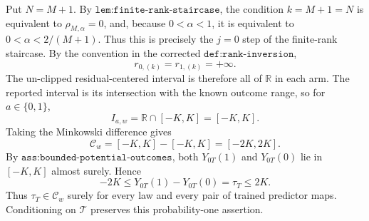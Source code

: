 Put \(N=M+1\). By \(\texttt{lem:finite-rank-staircase}\), the condition \(k=M+1=N\) is equivalent to \(\rho_{M,\alpha}=0\), and, because \(0<\alpha<1\), it is equivalent to \(0<\alpha<2/(M+1)\). Thus this is precisely the \(j=0\) step of the finite-rank staircase. By the convention in the corrected \(\texttt{def:rank-inversion}\),
\[r_{0,(k)}=r_{1,(k)}=+\infty.\]
The un-clipped residual-centered interval is therefore all of \(\mathbb R\) in each arm. The reported interval is its intersection with the known outcome range, so for \(a\in\{0,1\}\),
\[I_{a,w}=\mathbb R\cap[-K,K]=[-K,K].\]
Taking the Minkowski difference gives
\[\mathcal C_w=[-K,K]-[-K,K]=[-2K,2K].\]
By \(\texttt{ass:bounded-potential-outcomes}\), both \(Y_{0T}(1)\) and \(Y_{0T}(0)\) lie in \([-K,K]\) almost surely. Hence
\[-2K\le Y_{0T}(1)-Y_{0T}(0)=\tau_T\le2K.\]
Thus \(\tau_T\in\mathcal C_w\) surely for every law and every pair of trained predictor maps. Conditioning on \(\mathcal T\) preserves this probability-one assertion.